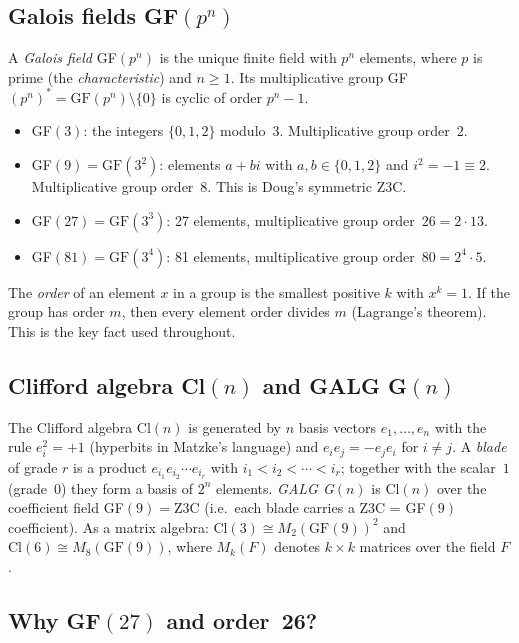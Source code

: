 \subsection*{Galois fields GF$(p^n)$}

A \emph{Galois field} GF$(p^n)$ is the unique finite field with $p^n$ elements,
where $p$ is prime (the \emph{characteristic}) and $n \geq 1$.
Its multiplicative group GF$(p^n)^* = \text{GF}(p^n) \setminus \{0\}$
is cyclic of order $p^n - 1$.
\begin{itemize}
  \item GF$(3)$: the integers $\{0,1,2\}$ modulo~3. Multiplicative group order~$2$.
  \item GF$(9) = \text{GF}(3^2)$: elements $a + bi$ with $a,b \in \{0,1,2\}$
        and $i^2 = -1 \equiv 2$. Multiplicative group order~$8$.
        This is Doug's symmetric Z3C.
  \item GF$(27) = \text{GF}(3^3)$: 27 elements, multiplicative group order~$26 = 2 \cdot 13$.
  \item GF$(81) = \text{GF}(3^4)$: 81 elements, multiplicative group order~$80 = 2^4 \cdot 5$.
\end{itemize}
The \emph{order} of an element $x$ in a group is the smallest positive $k$
with $x^k = 1$. If the group has order $m$, then every element order divides $m$
(Lagrange's theorem). This is the key fact used throughout.

\subsection*{Clifford algebra Cl$(n)$ and GALG G$(n)$}

The Clifford algebra Cl$(n)$ is generated by $n$ basis vectors $e_1,\ldots,e_n$
with the rule $e_i^2 = +1$ (hyperbits in Matzke's language) and
$e_i e_j = -e_j e_i$ for $i \neq j$.
A \emph{blade} of grade $r$ is a product $e_{i_1} e_{i_2} \cdots e_{i_r}$
with $i_1 < i_2 < \cdots < i_r$; together with the scalar~$1$ (grade~0)
they form a basis of $2^n$ elements.
\emph{GALG G$(n)$} is Cl$(n)$ over the coefficient field GF$(9) = \text{Z3C}$
(i.e.\ each blade carries a Z3C = GF$(9)$ coefficient).
As a matrix algebra:
$\text{Cl}(3) \cong M_2(\text{GF}(9))^2$ and
$\text{Cl}(6) \cong M_8(\text{GF}(9))$,
where $M_k(F)$ denotes $k \times k$ matrices over the field $F$.

\subsection*{Why GF$(27)$ and order~26?}


